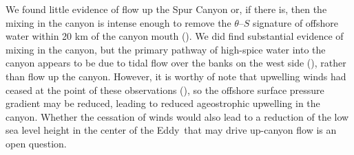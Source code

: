 \documentclass[draft]{agujournal2019}
\newcommand*{\Eddy}{{\sc Eddy}}
\begin{document}
We found little evidence of flow up the Spur Canyon or, if there is, then the mixing in the canyon is intense enough to remove the $\theta$--$S$ signature of offshore water within 20 km of the canyon mouth ().  We did find substantial evidence of mixing in the canyon, but the primary pathway of high-spice water into the canyon appears to be due to tidal flow over the banks on the west side (), rather than flow up the canyon.  However, it is worthy of note that upwelling winds had ceased at the point of these observations (), so the offshore surface pressure gradient may be reduced, leading to reduced ageostrophic upwelling in the canyon.  Whether the cessation of winds would also lead to a reduction of the low sea level height in the center of the \Eddy\ that may drive up-canyon flow is an open question.
\end{document}
